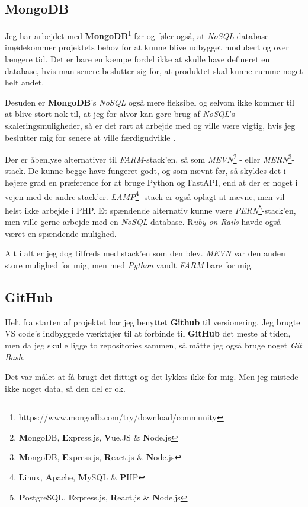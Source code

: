 \documentclass{report}
\begin{document}
\subsection{MongoDB}
Jeg har arbejdet med \textbf{MongoDB}\footnote{https://www.mongodb.com/try/download/community} før og føler også, at \textit{NoSQL} database imødekommer projektets behov for at kunne blive udbygget modulært og over længere tid. Det er bare en kæmpe fordel ikke at skulle have defineret en database, hvis man senere beslutter sig for, at produktet skal kunne rumme noget helt andet.\par{}
Desuden er \textbf{MongoDB}’s \textit{NoSQL} også mere fleksibel og selvom \projectName{} ikke kommer til at blive stort nok til, at jeg for alvor kan gøre brug af \textit{NoSQL}’s skaleringsmuligheder, så er det rart at arbejde med og ville være vigtig, hvis jeg beslutter mig for senere at ville færdigudvikle \projectName{}.\par{}
Der er åbenlyse alternativer til \textit{FARM}-stack’en, så som \textit{MEVN}\footnote{\textbf{M}ongoDB, \textbf{E}xpress.js, \textbf{V}ue.JS \& \textbf{N}ode.js}  - eller \textit{MERN}\footnote{\textbf{M}ongoDB, \textbf{E}xpress.js, \textbf{R}eact.js \& \textbf{N}ode.js}-stack. De kunne begge have fungeret godt, og som nævnt før, så skyldes det i højere grad en præference for at bruge Python og FastAPI, end at der er noget i vejen med de andre stack’er. \textit{LAMP}\footnote{\textbf{L}inux, \textbf{A}pache, \textbf{M}ySQL \& \textbf{P}HP} -stack er også oplagt at nævne, men vil helst ikke arbejde i PHP. Et spændende alternativ kunne være \textit{PERN}\footnote{\textbf{P}ostgreSQL, \textbf{E}xpress.js, \textbf{R}eact.js \& \textbf{N}ode.js}-stack’en, men ville gerne arbejde med en \textit{NoSQL} database. R\textit{uby on Rails} havde også været en spændende mulighed.\par{}
Alt i alt er jeg dog tilfreds med stack’en som den blev. \textit{MEVN} var den anden store mulighed for mig, men med \textit{Python} vandt \textit{FARM} bare for mig.

\subsection{GitHub}
Helt fra starten af projektet har jeg benyttet \textbf{Github} til versionering. Jeg brugte VS code’s indbyggede værktøjer til at forbinde til \textbf{GitHub} det meste af tiden, men da jeg skulle ligge to repositories sammen, så måtte jeg også bruge noget \textit{Git Bash}.\par{}
Det var målet at få brugt det flittigt og det lykkes ikke for mig. Men jeg mistede ikke noget data, så den del er ok.
\end{document}
